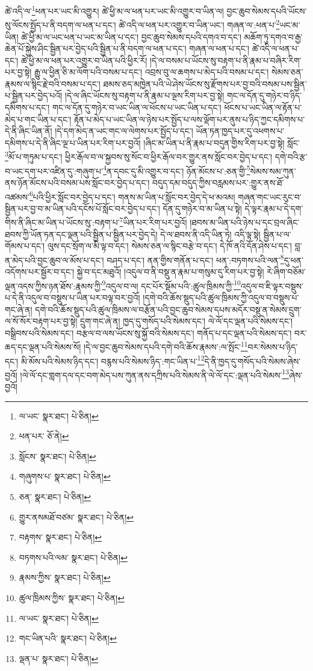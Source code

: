 ཚེ་འདི་ལ་\footnote{ལ་ཡང་  སྣར་ཐང་།  པེ་ཅིན། }ཕན་པར་ཡང་མི་འགྱུར། ཚེ་ཕྱི་མ་ལ་ཕན་པར་ཡང་མི་འགྱུར་བ་ཡིན་ལ། བྱང་ཆུབ་སེམས་དཔའི་ཡོངས་སུ་ལོངས་སྤྱོད་པ་ནི་བདག་ལ་ཕན་པ་དང་། ཚེ་འདི་ལ་ཕན་པར་འགྱུར་བ་ཡིན་ཡང་། གཞན་ལ་:ཕན་པ་\footnote{ཕན་པར་  ཅོ་ནེ། }ཡང་མ་ཡིན། ཚེ་ཕྱི་མ་ལ་ཡང་ཕན་པ་ཡང་མ་ཡིན་པ་དང་། བྱང་ཆུབ་སེམས་དཔའི་དགའ་བ་དང་། མཆོག་ཏུ་དགའ་བ་རྒྱ་ཆེན་པོ་སྐྱེས་ཤིང་སྦྱིན་པར་བྱེད་པའི་སྦྱིན་པ་ནི་བདག་ལ་ཕན་པ་དང་། གཞན་ལ་ཕན་པ་དང་། ཚེ་འདི་ལ་ཕན་པ་དང་། ཚེ་ཕྱི་མ་ལ་ཕན་པར་འགྱུར་བ་ཡིན་པའི་ཕྱིར་རོ། །དེ་ལ་བསམ་པ་ཡོངས་སུ་བརྟག་པ་ནི་རྣམ་པ་བཞིར་རིག་པར་བྱ་སྟེ། རྒྱུ་ལ་ཕྱིན་ཅི་མ་ལོག་པའི་བསམ་པ་དང་། འབྲས་བུ་ལ་ཆགས་པ་མེད་པའི་བསམ་པ་དང་། སེམས་ཅན་རྣམས་ལ་སྙིང་རྗེ་བའི་བསམ་པ་དང་། ཐམས་ཅད་མཁྱེན་པའི་ཡེ་ཤེས་ཡོངས་སུ་རྫོགས་པར་བྱ་བའི་བསམ་པས་སྦྱིན་པ་སྦྱིན་པར་བྱེད་པའོ། །དེ་ལ་ཞིང་ཡོངས་སུ་བརྟག་པ་ནི་རྣམ་པ་ལྔས་རིག་པར་བྱ་སྟེ། གང་ལ་དོན་དུ་གཉེར་བ་ཉིད་དམིགས་པ་དང་། གང་ལ་དོན་དུ་གཉེར་བ་ཡང་ཡིན་ལ་ཕོངས་པ་ཡང་ཡིན་པ་དང་། ཕོངས་པ་ཡང་ཡིན་ལ་རྟོན་པ་མེད་པ་གང་ཡིན་པ་དང་། རྟོན་པ་མེད་པ་ཡང་ཡིན་ལ་ཉེས་པར་སྤྱོད་པ་ལས་ལྡོག་པར་ནུས་པ་ཉིད་ཀྱང་དམིགས་པ་དེ་ནི་ཞིང་ཡིན་ནོ། །དེ་དག་མེད་ན་ཡང་གང་ལ་ལེགས་པར་སྤྱོད་པ་དང་། ཡོན་ཏན་ཁྱད་པར་དུ་འཕགས་པ་དམིགས་པ་དེ་ནི་ཞིང་ལྔ་པ་ཡིན་པར་རིག་པར་བྱའོ། །ཞིང་མ་ཡིན་པ་ནི་རྣམ་པ་བདུན་གྱིས་རིག་པར་བྱ་སྟེ། སློང་\footnote{སློངས་  སྣར་ཐང་།  པེ་ཅིན། }མོ་པ་གཏུམ་པ་དང་། ཕྱིར་རྒོལ་བ་ལ་སྐྱབས་སུ་སོང་བ་ཕྱིར་རྒོལ་བར་གྱུར་ནས་སློང་བར་བྱེད་པ་དང་། དགེ་བའི་རྩ་བ་ཡང་དག་པར་འཛིན་དུ་:གཞུག་པ་\footnote{གཞུགས་པ་  སྣར་ཐང་།  པེ་ཅིན། }ན་དབང་དུ་མི་འགྱུར་བ་དང་། ཉོན་མོངས་པ་:ཅན་གྱི་\footnote{ཅན་  སྣར་ཐང་།  པེ་ཅིན། }སེམས་སམ་ཀུན་ནས་ཉོན་མོངས་པའི་བསམ་པས་སློང་བར་བྱེད་པ་དང་། བདུད་དམ་བདུད་ཀྱིས་བརླམས་པར་:གྱུར་ནས་ཐོ་འཚམས་\footnote{གྱུར་ནསམཐོ་བཙམ་  སྣར་ཐང་།  པེ་ཅིན། }པའི་ཕྱིར་སློང་བར་བྱེད་པ་དང་། གནས་མ་ཡིན་པ་སློང་བར་བྱེད་དེ་ཕ་མའམ། གཞན་གང་ཡང་རུང་བ་སྦྱིན་པར་བྱ་བ་མ་ཡིན་པའི་དངོས་པོ་སློང་བར་བྱེད་པ་དང་། དོན་དུ་གཉེར་བ་མ་ཡིན་པ་སྟེ། དེ་ལྟར་རྣམ་པ་དེ་དག་གིས་ནི་ཞིང་མ་ཡིན་པ་ཡོངས་སུ་:བརྟག་པ་\footnote{བརྟགས་  སྣར་ཐང་།  པེ་ཅིན། }ཡིན་པར་རིག་པར་བྱའོ། །ཐབས་མ་ཡིན་པའི་ཉེས་པ་དང་བྲལ་ཞིང་ཐབས་ཀྱི་ཡོན་ཏན་དང་ལྡན་པའི་སྦྱིན་པ་སྦྱིན་པར་བྱེད་དེ། དེ་ལ་ཐབས་ནི་འདི་ཡིན་ཏེ། འདི་ལྟ་སྟེ། སྦྱིན་པ་ལ་གོམས་པ་དང་། ལུས་དང་སྲོག་ལ་མི་ལྟ་བ་དང་། སེམས་ཅན་ལ་སྙིང་བརྩེ་བ་དང་། དེ་ཁོ་ནའི་དོན་ཤེས་པ་དང་། བླ་ན་མེད་པའི་བྱང་ཆུབ་ལ་མོས་པ་དང་། བཤད་པ་དང་། ནན་གྱིས་གནོན་པ་དང་། ཕན་:བཏགས་པའི་ལན་\footnote{བཏགས་པའི་ལམ་  སྣར་ཐང་།  པེ་ཅིན། }དུ་ཕན་འདོགས་པར་སྦྱོར་བ་དང་། སྐྱེ་བ་དང་མཐུའོ། །འདུལ་བ་ནི་བསྡུ་ན་རྣམ་པ་གསུམ་དུ་རིག་པར་བྱ་སྟེ། རེ་ཞིག་བཅོམ་ལྡན་འདས་ཀྱིས་ཉན་ཐོས་:རྣམས་ཀྱི་\footnote{རྣམས་ཀྱིས་  སྣར་ཐང་།  པེ་ཅིན། }འདུལ་བ་ལ། དང་པོར་སྡོམ་པའི་:ཚུལ་ཁྲིམས་ཀྱི་\footnote{ཚུལ་ཁྲིམས་ཀྱིས་  སྣར་ཐང་།  པེ་ཅིན། }འདུལ་བ་ཇི་ལྟར་བསྡུས་པ་དེ་ནི་འདུལ་བ་བསྡུས་པ་ཡིན་པར་བལྟ་བར་བྱའོ། །དགེ་བའི་ཆོས་སྡུད་པའི་ཚུལ་ཁྲིམས་ཀྱི་འདུལ་བ་བསྡུས་པ་གང་ཞེ་ན། དགེ་བའི་ཆོས་སྡུད་པའི་ཚུལ་ཁྲིམས་ལ་བརྩོན་པའི་བྱང་ཆུབ་སེམས་དཔས་མདོར་བསྡུ་ན་སེམས་དྲུག་ལ་སོ་སོར་བརྟག་པར་བྱ་སྟེ། དྲུག་གང་ཞེ་ན། ཁྱད་དུ་གསོད་པའི་སེམས་དང་། ལེ་ལོ་དང་ལྡན་པའི་སེམས་དང་། བསྒྲིབས་པའི་སེམས་དང་། བརྩལ་བ་ལས་ཡོངས་སུ་སྐྱོ་བའི་སེམས་དང་། གནོད་པ་དང་ལྡན་པའི་སེམས་དང་། བར་ཆད་དང་ལྡན་པའི་སེམས་སོ། །དེ་ལ་བྱང་ཆུབ་སེམས་དཔའི་དགེ་བའི་ཆོས་རྣམས་:ལ་སྤོང་\footnote{ལ་ཡང་  སྣར་ཐང་།  པེ་ཅིན། }བར་སེམས་པ་ཉིད་དང་། མི་མོས་པའི་སེམས་ཉིད་དང་། བརྙས་པའི་སེམས་ཉིད་:གང་ཡིན་པ་\footnote{གང་ཡིན་པའི་  སྣར་ཐང་།  པེ་ཅིན། }དེ་ནི་ཁྱད་དུ་གསོད་པའི་སེམས་ཞེས་བྱའོ། །ལེ་ལོ་དང་གླག་དལ་དང་བག་མེད་པས་ཀུན་ནས་དཀྲིས་པའི་སེམས་ནི་ལེ་ལོ་དང་:ལྡན་པའི་སེམས་\footnote{ལྡན་པ་  སྣར་ཐང་།  པེ་ཅིན། }ཞེས་བྱའོ། 